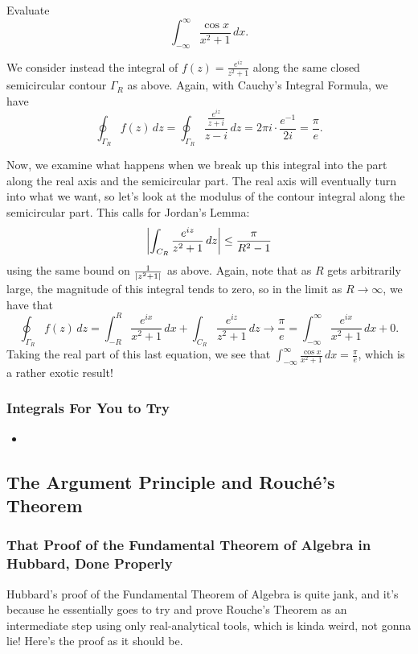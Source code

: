 \begin{example}
  Evaluate \[\int_{-\infty}^{\infty} \frac{\cos x}{x^2 + 1}\, dx.\]
\end{example}
\begin{solution}
  We consider instead the integral of $f(z) = \frac{e^{iz}}{z^2 + 1}$ along the same closed semicircular contour $\Gamma_R$ as above. Again, with Cauchy's Integral Formula, we have
  \[ \oint_{\Gamma_R} f(z) \, dz = \oint_{\Gamma_R} \frac{\frac{e^{iz}}{z+i}}{z-i} \, dz = 2\pi i \cdot \frac{e^{-1}}{2i} = \frac{\pi} e .\]

  Now, we examine what happens when we break up this integral into the part along the real axis and the semicircular part. The real axis will eventually turn into what we want, so let's look at the modulus of the contour integral along the semicircular part. This calls for Jordan's Lemma:
  \[
    \left\lvert \int_{C_R} \frac{e^{iz}}{z^2 + 1} \, dz \right\rvert \leq \frac{\pi}{R^2 - 1}
  \]
  using the same bound on $\frac 1{\left\lvert z^2 +1 \right\rvert}$ as above. Again, note that as $R$ gets arbitrarily large, the magnitude of this integral tends to zero, so in the limit as $R \to \infty$, we have that
  \[ \oint_{\Gamma_R} f(z) \, dz = \int_{-R}^R \frac{e^{ix}}{x^2 + 1} \, dx + \int_{C_R} \frac{e^{iz}}{z^2 + 1} \, dz \to \frac \pi e = \int_{-\infty}^\infty \frac{e^{ix}}{x^2 + 1} \, dx + 0 .\]
  Taking the real part of this last equation, we see that $\int_{-\infty}^\infty \frac{\cos x}{x^2 + 1} \, dx = \frac \pi e$, which is a rather exotic result!
\end{solution}

\subsubsection{Integrals For You to Try}
\begin{itemize}
  \item
\end{itemize}

\subsection{The Argument Principle and Rouch\'{e}'s Theorem}


\subsubsection{That Proof of the Fundamental Theorem of Algebra in Hubbard, Done Properly}
Hubbard's proof of the Fundamental Theorem of Algebra is quite jank, and it's because he essentially goes to try and prove Rouche's Theorem as an intermediate step using only real-analytical tools, which is kinda weird, not gonna lie! Here's the proof as it should be.

